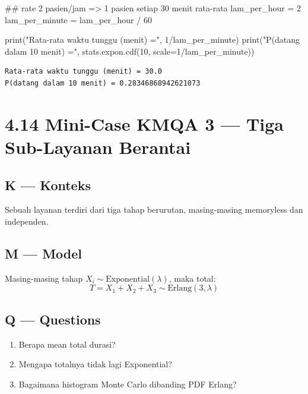 \documentclass[
  letterpaper,
  DIV=11,
  numbers=noendperiod]{scrreprt}
\newenvironment{Shaded}{\begin{snugshade}}{\end{snugshade}}
\newcommand{\BuiltInTok}[1]{\textcolor[rgb]{0.00,0.23,0.31}{#1}}
\newcommand{\CommentTok}[1]{\textcolor[rgb]{0.37,0.37,0.37}{#1}}
\newcommand{\DecValTok}[1]{\textcolor[rgb]{0.68,0.00,0.00}{#1}}
\newcommand{\NormalTok}[1]{\textcolor[rgb]{0.00,0.23,0.31}{#1}}
\newcommand{\OperatorTok}[1]{\textcolor[rgb]{0.37,0.37,0.37}{#1}}
\newcommand{\StringTok}[1]{\textcolor[rgb]{0.13,0.47,0.30}{#1}}
\providecommand{\tightlist}{%
  \setlength{\itemsep}{0pt}\setlength{\parskip}{0pt}}
\begin{document}
\begin{Shaded}
\begin{Highlighting}[]
\CommentTok{\#\# rate 2 pasien/jam =\textgreater{} 1 pasien setiap 30 menit rata{-}rata}
\NormalTok{lam\_per\_hour }\OperatorTok{=} \DecValTok{2}
\NormalTok{lam\_per\_minute }\OperatorTok{=}\NormalTok{ lam\_per\_hour }\OperatorTok{/} \DecValTok{60}

\BuiltInTok{print}\NormalTok{(}\StringTok{"Rata{-}rata waktu tunggu (menit) ="}\NormalTok{, }\DecValTok{1}\OperatorTok{/}\NormalTok{lam\_per\_minute)}
\BuiltInTok{print}\NormalTok{(}\StringTok{"P(datang dalam 10 menit) ="}\NormalTok{, stats.expon.cdf(}\DecValTok{10}\NormalTok{, scale}\OperatorTok{=}\DecValTok{1}\OperatorTok{/}\NormalTok{lam\_per\_minute))}
\end{Highlighting}
\end{Shaded}

\begin{verbatim}
Rata-rata waktu tunggu (menit) = 30.0
P(datang dalam 10 menit) = 0.28346868942621073
\end{verbatim}

\section{4.14 Mini-Case KMQA 3 --- Tiga Sub-Layanan
Berantai}\label{mini-case-kmqa-3-tiga-sub-layanan-berantai}

\subsection{K --- Konteks}\label{k-konteks-30}

Sebuah layanan terdiri dari tiga tahap berurutan, masing-masing
memoryless dan independen.

\subsection{M --- Model}\label{m-model-30}

Masing-masing tahap \(X_i \sim \mathrm{Exponential}(\lambda)\), maka
total: \[
T = X_1 + X_2 + X_3 \sim \text{Erlang}(3,\lambda)
\]

\subsection{Q --- Questions}\label{q-questions-30}

\begin{enumerate}
\def\labelenumi{\arabic{enumi}.}
\tightlist
\item
  Berapa mean total durasi?
\item
  Mengapa totalnya tidak lagi Exponential?
\item
  Bagaimana histogram Monte Carlo dibanding PDF Erlang?
\end{enumerate}
\end{document}
